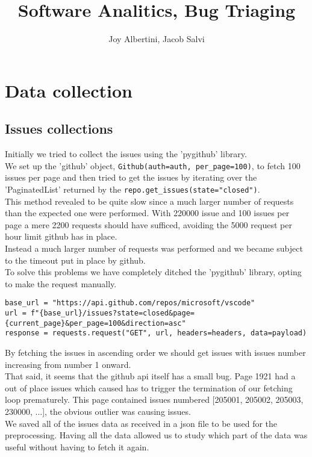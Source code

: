 \documentclass[tikz,10pt,fleqn]{article}
\title{Software Analitics, Bug Triaging}
\author{Joy Albertini, Jacob Salvi}
\date{}
\begin{document}
\maketitle

\section*{Data collection}
\subsection*{Issues collections}
Initially we tried to collect the issues using the 'pygithub' library.\\
We set up the 'github' object, \texttt{Github(auth=auth, per_page=100)}, to fetch 100 issues per page and then tried to get the issues by iterating over the 'PaginatedList' returned by the \texttt{repo.get_issues(state="closed")}.\\
This method revealed to be quite slow since a much larger number of requests than the expected one were performed. With 220000 issue and 100 issues per page a mere 2200 requests should have sufficed, avoiding the 5000 request per hour limit github has in place.\\
Instead a much larger number of requests was performed and we became subject to the timeout put in place by github. \\
To solve this problems we have completely ditched the 'pygithub' library, opting to make the request manually.

\begin{verbatim}
base_url = "https://api.github.com/repos/microsoft/vscode"
url = f"{base_url}/issues?state=closed&page={current_page}&per_page=100&direction=asc"
response = requests.request("GET", url, headers=headers, data=payload)
\end{verbatim}

By fetching the issues in ascending order we should get issues with issues number increasing from number 1 onward.\\
That said, it seems that the github api itself has a small bug. Page 1921 had a out of place issues which caused has to trigger the termination of our fetching loop prematurely. This page contained issues numbered [205001, 205002, 205003, 230000, ...], the obvious outlier was causing issues.\\
We saved all of the issues data as received in a json file to be used for the preprocessing. Having all the data allowed us to study which part of the data was useful without having to fetch it again.
\end{document}
